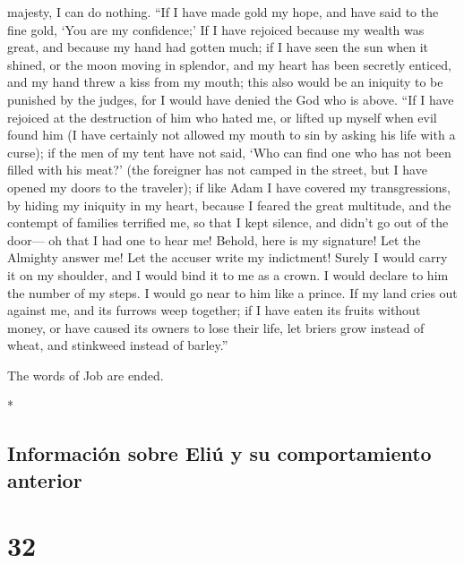 \begin{paracol}{2}
\begin{otherlanguage}{english}
majesty, I can do nothing.  ``If I have made gold my
hope, and have said to the fine gold, `You are my confidence;'
 If I have rejoiced because my wealth was great, and
because my hand had gotten much;  if I have seen the sun
when it shined, or the moon moving in splendor,  and my
heart has been secretly enticed, and my hand threw a kiss from my mouth;
 this also would be an iniquity to be punished by the
judges, for I would have denied the God who is above. 
``If I have rejoiced at the destruction of him who hated me, or lifted
up myself when evil found him  (I have certainly not
allowed my mouth to sin by asking his life with a curse);
 if the men of my tent have not said, `Who can find one
who has not been filled with his meat?'  (the foreigner
has not camped in the street, but I have opened my doors to the
traveler);  if like Adam I have covered my
transgressions, by hiding my iniquity in my heart, 
because I feared the great multitude, and the contempt of families
terrified me, so that I kept silence, and didn't go out of the door---
 oh that I had one to hear me! Behold, here is my
signature! Let the Almighty answer me! Let the accuser write my
indictment!  Surely I would carry it on my shoulder, and
I would bind it to me as a crown.  I would declare to him
the number of my steps. I would go near to him like a prince.
 If my land cries out against me, and its furrows weep
together;  if I have eaten its fruits without money, or
have caused its owners to lose their life,  let briers
grow instead of wheat, and stinkweed instead of barley.''

The words of Job are ended.

\end{otherlanguage}

\switchcolumn[0]*

\hypertarget{informaciuxf3n-sobre-eliuxfa-y-su-comportamiento-anterior}{%
\subsection{Información sobre Eliú y su comportamiento
anterior}\label{informaciuxf3n-sobre-eliuxfa-y-su-comportamiento-anterior}}

\hypertarget{section-62}{%
\section{32}\label{section-62}}


\end{paracol}

